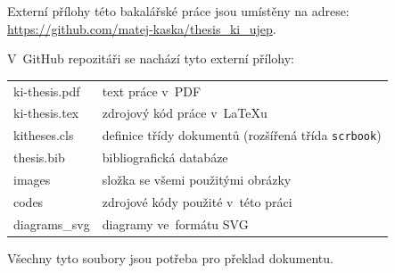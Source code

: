 \documentclass[male,czech,api_bc]{kitheses}
\begin{document}
Externí přílohy této bakalářské práce jsou umístěny na adrese:\\ \url{https://github.com/matej-kaska/thesis_ki_ujep}.

V~GitHub repozitáři se nachází tyto externí přílohy:

\begin{longtable}{ll}
	\hline
	ki-thesis.pdf & text práce v~PDF \\
	ki-thesis.tex & zdrojový kód práce v~\LaTeX{}u \\
	kitheses.cls & definice třídy dokumentů (rozšířená třída \texttt{scrbook})\\
	thesis.bib & bibliografická databáze \\
	images & složka se všemi použitými obrázky \\
	codes & zdrojové kódy použité v~této práci \\
	diagrams\_svg & diagramy ve~formátu SVG \\
	\hline
\end{longtable}

Všechny tyto soubory jsou potřeba pro překlad dokumentu.
\end{document}
